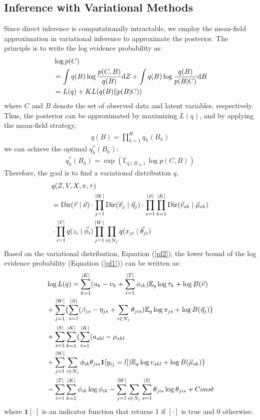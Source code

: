 \documentclass[letterpaper]{article} %
\begin{document}
\subsection{Inference with Variational Methods}
Since direct inference is computationally intractable, we employ the mean-field approximation in variational inference \cite{Bishop2006,Bleietal2017} to approximate the posterior. The principle is to write the log evidence probability as:
\begin{align}
  &\log p(C)\notag\\
  &=\int q(B)\log{\frac{p(C, B)}{q(B)}}{\rm{d}}Z
  +\int q(B)\log{\frac{q(B)}{p(B|C)}}{\rm{d}}B \notag\\
  &=L(q)+KL(q(B)\|p(B|C))
  \label{pf2}
\end{align}
where $C$ and $B$ denote the set of observed data and latent variables, respectively. Thus, the posterior can be approximated by maximizing $L(q)$, and by applying the mean-field strategy,
\begin{align}
q(B)=\prod_{h=1}^{H}q_{h}(B_{h})
\label{qf1}
\end{align}
we can achieve the optimal $q_{h}^{*}(B_{h})$:
\begin{align}
q_{h}^{*}(B_{h})=\exp(\mathbb{E}_{q(B_{\neg h})}\log p(C, B))
\label{qf2}
\end{align}
Therefore, the goal is to find a variational distribution $q$,
\begin{align}
  &q(Z, V, X, \pi, \tau) \notag\\
  &=\text{Dir}(\vec{\tau} \mid \vec{\nu})\cdot \prod_{j=1}^{|W|}\text{Dir}(\vec{\pi}_{j} \mid \vec{\eta}_{j})\cdot\prod_{s=1}^{|S|}\prod_{k=1}^{|K|}\text{Dir}(\vec{v}_{sk} \mid\vec{\mu}_{sk}) \notag\\
  &\cdot\prod_{i=1}^{|T|}q(z_{i}\mid \vec{\phi}_{i})\prod_{j=1}^{|W|}\prod_{i\in N_{j}}q(x_{ji}\mid \vec{\theta}_{ji})
  \label{qf3}
\end{align}
Based on the variational distribution, Equation (\ref{pf2}), the lower bound of the log evidence probability (Equation (\ref{pf1})) can be written as:
\begin{align}
  &\log L(q)=\sum_{k=1}^{|K|}(u_{k}-\nu_{k}+\sum_{i=1}^{|T|}\phi_{ik})\mathbb{E}_{q}\log\tau_{k}+\log B(\vec{\nu}) \notag\\
  &+\sum_{j=1}^{|W|}\{\sum_{s=1}^{|S|}(\beta_{js}-\eta_{js}+\sum_{i\in N_{j}}\theta_{jis})\mathbb{E}_{q}\log\pi_{js}+\log B(\vec{\eta}_{j})\} \notag\\
  &+\sum_{s=1}^{|S|}\sum_{k=1}^{|K|}\{\sum_{l=1}^{|K|}(a_{skl}-\mu_{skl} \notag\\
  &+\sum_{j=1}^{|W|}\sum_{i\in N_{j}}\phi_{ik}\theta_{jis}\mathbf{1}[y_{ij}=l])\mathbb{E}_{q}\log v_{skl}+\log B(\vec{\mu}_{sk})\}\notag\\
  &-\sum_{i=1}^{|T|}\sum_{k=1}^{|K|}\phi_{ik}\log\phi_{ik}-\sum_{j=1}^{|W|}\sum_{i\in N_{j}}\sum_{s=1}^{|S|}\theta_{jis}\log\theta_{jis}+Const
  \label{qf4}
\end{align}
where $\mathbf{1}[\cdot]$ is an indicator function that returns 1 if $[\cdot]$ is true and 0 otherwise.
\end{document}
